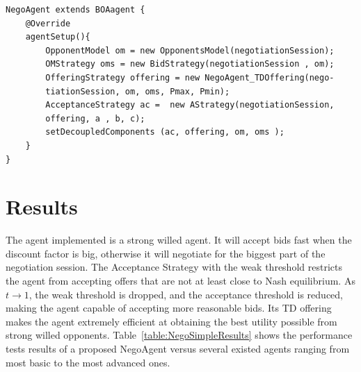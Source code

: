 \documentclass[html]{report}    %
\begin{document}
\begin{verbatim}
NegoAgent extends BOAagent {    
    @Override
    agentSetup(){
        OpponentModel om = new OpponentsModel(negotiationSession);
        OMStrategy oms = new BidStrategy(negotiationSession , om);
        OfferingStrategy offering = new NegoAgent_TDOffering(nego-
        tiationSession, om, oms, Pmax, Pmin);
        AcceptanceStrategy ac =  new AStrategy(negotiationSession,
        offering, a , b, c);
        setDecoupledComponents (ac, offering, om, oms );
    }
}
\end{verbatim}

\section{Results}

The agent implemented is a strong willed agent. It will accept bids fast when the discount factor is big, otherwise it will negotiate for the biggest part of the negotiation session. The Acceptance Strategy with the weak threshold restricts the agent from accepting offers that are not at least close to Nash equilibrium. As $t\to1$, the weak threshold is dropped, and the acceptance threshold is reduced, making the agent capable of accepting more reasonable bids. Its TD offering makes the agent extremely efficient at obtaining the best utility possible from strong willed opponents. Table~\ref{table:NegoSimpleResults} shows the performance tests results of a proposed NegoAgent versus several existed agents ranging from most basic to the most advanced ones.
\end{document}
